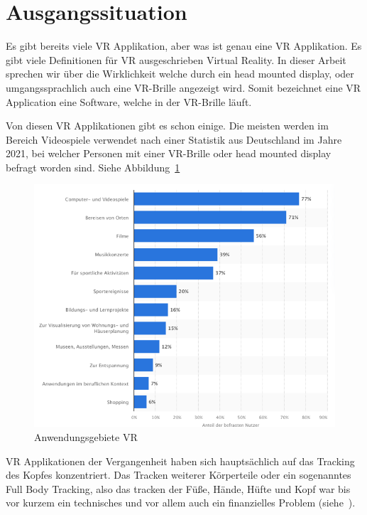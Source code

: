 \section{Ausgangssituation}\label{sec: initial_situation}

Es gibt bereits viele VR Applikation, aber was ist genau eine VR Applikation.
Es gibt viele Definitionen für VR ausgeschrieben Virtual Reality.
In dieser Arbeit sprechen wir über die Wirklichkeit welche durch ein head mounted display, oder umgangssprachlich auch eine VR-Brille angezeigt wird.
Somit bezeichnet eine VR Application eine Software, welche in der VR-Brille läuft.

Von diesen VR Applikationen gibt es schon einige.
Die meisten werden im Bereich Videospiele verwendet nach einer Statistik aus Deutschland im Jahre 2021, bei welcher Personen mit einer VR-Brille oder head mounted display befragt worden sind.
Siehe Abbildung~\ref{fig:statistic_usage_vr}~\cite{BITKOM_2021}

\begin{figure}
    \includegraphics[scale=0.5]{pics/statistic_usage_vr}
    \caption{Anwendungsgebiete VR}
    \label{fig:statistic_usage_vr}
\end{figure}

VR Applikationen der Vergangenheit haben sich hauptsächlich auf das Tracking des Kopfes konzentriert.
Das Tracken weiterer Körperteile oder ein sogenanntes Full Body Tracking, also das tracken der Füße, Hände, Hüfte und Kopf war bis vor kurzem ein technisches und vor allem auch ein finanzielles Problem (siehe~\cite{PAVEL_NUZHDIN_2020}).

